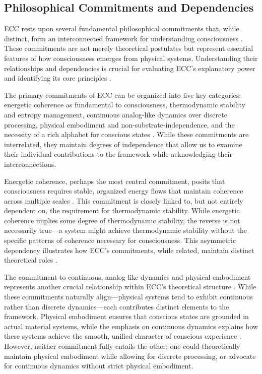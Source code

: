 \begin{refsection}
\section{Philosophical Commitments and Dependencies}

ECC rests upon several fundamental philosophical commitments that, while distinct, form an interconnected framework for understanding consciousness \cite{van1995what}. These commitments are not merely theoretical postulates but represent essential features of how consciousness emerges from physical systems. Understanding their relationships and dependencies is crucial for evaluating ECC's explanatory power and identifying its core principles \cite{di2017sensorimotor}.

The primary commitments of ECC can be organized into five key categories: energetic coherence as fundamental to consciousness, thermodynamic stability and entropy management, continuous analog-like dynamics over discrete processing, physical embodiment and non-substrate-independence, and the necessity of a rich alphabet for conscious states \cite{noe2004action}. While these commitments are interrelated, they maintain degrees of independence that allow us to examine their individual contributions to the framework while acknowledging their interconnections.

Energetic coherence, perhaps the most central commitment, posits that consciousness requires stable, organized energy flows that maintain coherence across multiple scales \cite{thompson2007mind}. This commitment is closely linked to, but not entirely dependent on, the requirement for thermodynamic stability. While energetic coherence implies some degree of thermodynamic stability, the reverse is not necessarily true—a system might achieve thermodynamic stability without the specific patterns of coherence necessary for consciousness. This asymmetric dependency illustrates how ECC's commitments, while related, maintain distinct theoretical roles \cite{varela1991embodied}.

The commitment to continuous, analog-like dynamics and physical embodiment represents another crucial relationship within ECC's theoretical structure \cite{gallagher2005how}. While these commitments naturally align—physical systems tend to exhibit continuous rather than discrete dynamics—each contributes distinct elements to the framework. Physical embodiment ensures that conscious states are grounded in actual material systems, while the emphasis on continuous dynamics explains how these systems achieve the smooth, unified character of conscious experience \cite{oregan2001sensorimotor}. However, neither commitment fully entails the other; one could theoretically maintain physical embodiment while allowing for discrete processing, or advocate for continuous dynamics without strict physical embodiment.


\end{refsection}
